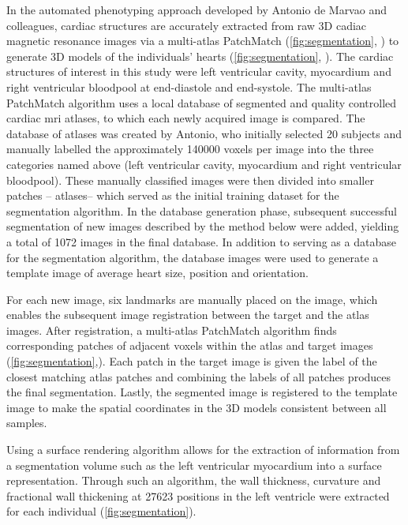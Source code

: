 In the automated phenotyping approach developed by Antonio de Marvao and colleagues, cardiac structures are accurately extracted from raw 3D cadiac magnetic resonance images via a multi-atlas PatchMatch (\cref{fig:segmentation}, ) to generate 3D models of the individuals' hearts  (\cref{fig:segmentation}, ). The cardiac structures of interest in this study were left ventricular cavity, myocardium and right ventricular bloodpool at end-diastole and end-systole. The multi-atlas PatchMatch algorithm uses a local database of segmented and quality controlled cardiac \gls{mri} atlases, to which each newly acquired image is compared. The database of atlases was created by Antonio, who initially selected \num{20} subjects and manually labelled the approximately \num{140000} voxels per image into the three categories named above (left ventricular cavity, myocardium and right ventricular bloodpool). These manually classified images were then divided into smaller patches -- atlases-- which served as the initial training dataset for the segmentation algorithm. In the database generation phase, subsequent successful segmentation of new images described by the method below were added, yielding a total of \num{1072} images in the final database. In addition to serving as a database for the segmentation algorithm, the database images were used to generate a template image of average heart size, position and orientation. 

For each new image, six landmarks are manually placed on the image, which enables the subsequent image registration between the target and the atlas images. After registration, a multi-atlas PatchMatch algorithm finds corresponding patches of adjacent voxels within the atlas and target images (\cref{fig:segmentation},). Each patch in the target image is given the label of the closest matching atlas patches and combining the labels of all patches produces the final segmentation. Lastly, the segmented image is registered to the template image to make the spatial coordinates in the 3D models consistent between all samples.  

Using a surface rendering algorithm allows for the extraction of information from a segmentation volume such as the left ventricular myocardium into a surface representation. Through such an algorithm, the wall thickness, curvature and  fractional wall thickening at \num{27623} positions in the left ventricle were extracted for each individual (\cref{fig:segmentation}). %
\\

